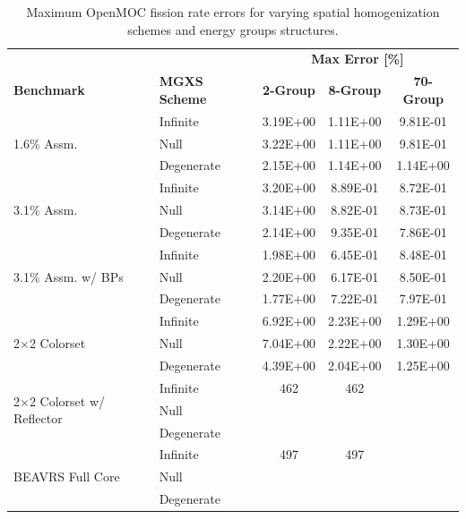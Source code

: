 \begin{table}[h!]
  \centering
  \caption[Maximum OpenMOC fission rate errors]{Maximum OpenMOC fission rate errors for varying spatial homogenization schemes and energy groups structures.}
  \small
  \label{table:chap8-openmoc-max-fiss-rates}
  \vspace{6pt}
  \begin{tabular}{l l c c c}
  \toprule
  \rowcolor{lightgray}
  & & \multicolumn{3}{c}{\cellcolor{lightgray} \textbf{Max Error [\%]}} \\
  \multirow{-2}{*}{\cellcolor{lightgray} \bf Benchmark} &
  \multirow{-2}{*}{\cellcolor{lightgray} \bf \ac{MGXS} Scheme} &
  {\cellcolor{lightgray} \bf 2-Group} &
  {\cellcolor{lightgray} \bf 8-Group} &
  {\cellcolor{lightgray} \bf 70-Group} \\
  \midrule
\multirow{3}{*}{\parbox{2.5cm}{1.6\% Assm.}} & Infinite & 3.19E+00 & 1.11E+00 & 9.81E-01 \\
& Null & 3.22E+00 & 1.11E+00 & 9.81E-01 \\
& Degenerate & 2.15E+00 & 1.14E+00 & 1.14E+00 \\
  \midrule
\multirow{3}{*}{\parbox{2.5cm}{3.1\% Assm.}} & Infinite & 3.20E+00 & 8.89E-01 & 8.72E-01 \\
& Null & 3.14E+00 & 8.82E-01 & 8.73E-01 \\
& Degenerate & 2.14E+00 & 9.35E-01 & 7.86E-01 \\
  \midrule
\multirow{3}{*}{\parbox{2.5cm}{3.1\% Assm. w/ \acp{BP}}} & Infinite & 1.98E+00 & 6.45E-01 & 8.48E-01 \\
& Null & 2.20E+00 & 6.17E-01 & 8.50E-01 \\
& Degenerate & 1.77E+00 & 7.22E-01 & 7.97E-01 \\
  \midrule
  \multirow{3}{*}{\parbox{2.5cm}{2$\times$2 Colorset}} & Infinite & 6.92E+00 & 2.23E+00 & 1.29E+00 \\
& Null & 7.04E+00 & 2.22E+00 & 1.30E+00 \\
& Degenerate & 4.39E+00 & 2.04E+00 & 1.25E+00 \\
  \midrule
  \multirow{3}{*}{\parbox{2.3cm}{2$\times$2 Colorset w/ Reflector}} & Infinite & 462 & 462 & \\
  & Null & & & \\
  & Degenerate & & & \\
  \midrule
  \multirow{3}{*}{\parbox{2cm}{\ac{BEAVRS} Full Core}} & Infinite & 497 & 497 & \\
  & Null & & & \\
  & Degenerate & & & \\
  \bottomrule
\end{tabular}
\end{table}

